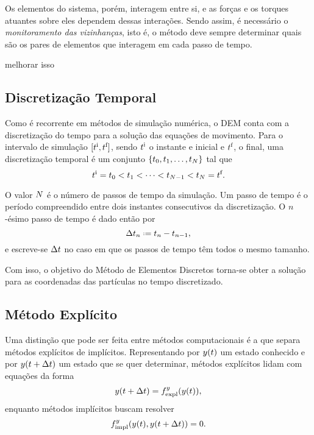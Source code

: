 Os elementos do sistema, porém, interagem entre si, e as forças e os torques atuantes sobre eles dependem dessas interações. Sendo assim, é necessário o \textit{monitoramento das vizinhanças}, isto é, o método deve sempre determinar quais são os pares de elementos que interagem em cada passo de tempo.

\alert{melhorar isso}

\subsection{Discretização Temporal}

Como é recorrente em métodos de simulação numérica, o DEM conta com a discretização do tempo para a solução das equações de movimento. Para o intervalo de simulação \(\interval{\initial{t}}{\final{t}}\), sendo \(t^{\text{i}}\) o instante e inicial e \(t^{\text{f}}\), o final, uma discretização temporal é um conjunto \(\left\lbrace t_0, t_1, \dotsc, t_{N} \right\rbrace\) tal que
\begin{equation*}
	t^{\text{i}} = t_0 < t_1 < \dotsb < t_{N - 1} < t_{N} = t^{\text{f}}.
\end{equation*}

O valor \(N\) é o número de passos de tempo da simulação. Um passo de tempo é o período compreendido entre dois instantes consecutivos da discretização. O \(n\)-ésimo passo de tempo é dado então por
\begin{equation*}
	\Dt_{n} \eqdef t_{n} - t_{n-1},
\end{equation*}
e escreve-se \(\Delta t\) no caso em que os passos de tempo têm todos o mesmo tamanho.

Com isso, o objetivo do Método de Elementos Discretos torna-se obter a solução para as coordenadas das partículas no tempo discretizado.

\subsection{Método Explícito}

Uma distinção que pode ser feita entre métodos computacionais é a que separa métodos explícitos de implícitos. Representando por \(y\pqty{t}\) um estado conhecido e por \(y\pqty{t+\Dt}\) um estado que se quer determinar, métodos explícitos lidam com equações da forma
\begin{equation*}
	y\pqty{t+\Dt} = \eqForExplicit{y}\pqty{y\pqty{t}},
\end{equation*}
enquanto métodos implícitos buscam resolver
\begin{equation*}
	\eqForImplicit{y}\pqty{y\pqty{t}, y\pqty{t+\Dt}} = 0.
\end{equation*}

